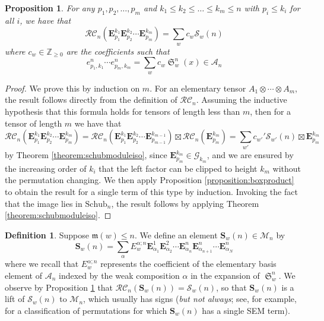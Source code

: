 \documentclass{amsart}
\newtheorem{proposition}[lemma]{Proposition}
\theoremstyle{definition}
\newtheorem{definition}[lemma]{Definition}
\theoremstyle{remark}
\numberwithin{equation}{subsection}
\DeclareMathOperator{\sch}{\mathfrak{S}}
\newcommand{\grass}{\mathcal{G}}
\newcommand{\RC}{\mathcal{RC}}
\newcommand{\coma}{\mathcal{A}}
\newcommand{\maxd}{\mathfrak{m}}
\begin{document}
\begin{proposition} \label{proposition:eproductworks}
For any $p_1,p_2,\ldots,p_m$ and $k_1\leq k_2\leq\ldots\leq k_m\leq n$ with $p_i\leq k_i$ for all $i$, we have that
$$\RC_n(\mathbf{E}_{p_1}^{k_1}\mathbf{E}_{p_2}^{k_2}\cdots\mathbf{E}_{p_m}^{k_m}) = \sum_{w} c_w\mathcal{S}_w(n)$$
where $c_w\in \mathbb{Z}_{\geq 0}$ are the coefficients such that
$$e_{p_1,k_1}^n\cdots e_{p_m,k_m}^n = \sum_w c_w \sch_w^n(x)\in \coma_n$$
\end{proposition}
\begin{proof}
We prove this by induction on $m$. For an elementary tensor $A_1\otimes \cdots \otimes A_m$, the result follows directly from the definition of $\RC_n$. Assuming the inductive hypothesis that this formula holds for tensors of length less than $m$, then for a tensor of length $m$ we have that
$$\RC_n(\mathbf{E}_{p_1}^{k_1}\mathbf{E}_{p_2}^{k_2}\cdots\mathbf{E}_{p_m}^{k_m}) = \RC_n(\mathbf{E}_{p_1}^{k_1}\mathbf{E}_{p_2}^{k_2}\cdots\mathbf{E}_{p_{m-1}}^{k_{m-1}})\boxtimes \RC_n(\mathbf{E}_{p_m}^{k_m})=\sum_{w'} c_{w'}' \mathcal{S}_{w'}(n)\boxtimes \mathbf{E}_{p_m}^{k_m}$$
by Theorem \ref{theorem:schubmoduleiso}, since $\mathbf{E}_{p_m}^{k_m}\in\grass_{k_m}$, and we are ensured by the increasing order of $k_i$ that the left factor can be clipped to height $k_m$ without the permutation changing. We then apply Proposition \ref{proposition:boxproduct} to obtain the result for a single term of this type by induction. Invoking the fact that the image lies in $\mathrm{Schub}_n$, the result follows by applying Theorem \ref{theorem:schubmoduleiso}.
\end{proof}


\begin{definition}
  Suppose $\maxd(w)\leq n$. We define an element $\mathbf{S}_w(n)\in \mathcal{M}_n$ by
  $$\mathbf{S}_w(n) = \sum_{\alpha} E_w^{\alpha;n}\mathbf{E}_{\alpha_1}^1 \mathbf{E}_{\alpha_2}^2 \cdots  \mathbf{E}_{\alpha_n}^n\mathbf{E}_{\alpha_{n+1}}^n\cdots \mathbf{E}_{\alpha_N}^n$$
  where we recall that $E_w^{\alpha;n}$ represents the coefficient of the elementary basis element of $\coma_n$ indexed by the weak composition $\alpha$ in the expansion of $\sch_w^n$. We observe by Proposition \ref{proposition:eproductworks} that $\RC_n(\mathbf{S}_w(n)) = \mathcal{S}_w(n)$, so that $\mathbf{S}_w(n)$ is a lift of $\mathcal{S}_w(n)$ to $\mathcal{M}_n$, which usually has signs (\emph{but not always}; see, for example, \cite{woodruff2025single} for a classification of permutations for which $\mathbf{S}_w(n)$ has a single SEM term).
\end{definition}
\end{document}

